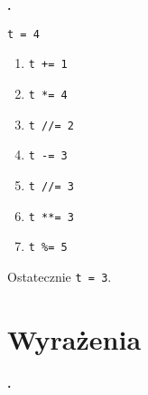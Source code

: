 \documentclass[a4paper]{article}
\begin{document}
\textbf{.}\addtocounter{zadanie}{1}

\verb|t = 4|

\begin{enumerate}[label=\arabic*.]
    \item \verb|t += 1|
    \item \verb|t *= 4|
    \item \verb|t //= 2|
    \item \verb|t -= 3|
    \item \verb|t //= 3|
    \item \verb|t **= 3|
    \item \verb|t %= 5|
\end{enumerate}

Ostatecznie \verb|t = 3|.

\section{Wyrażenia}

\textbf{.}\addtocounter{zadanie}{1}
\end{document}
